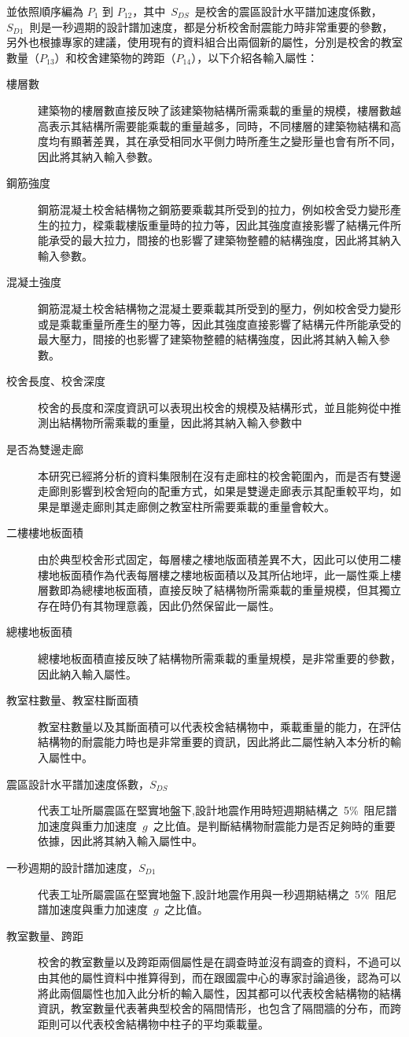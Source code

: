 並依照順序編為 $P_1$ 到 $P_{12}$，其中~$S_{DS}$~是校舍的震區設計水平譜加速度係數，~$S_{D1}$~則是一秒週期的設計譜加速度，都是分析校舍耐震能力時非常重要的參數，另外也根據專家的建議，使用現有的資料組合出兩個新的屬性，分別是校舍的教室數量（$P_{13}$）和校舍建築物的跨距（$P_{14}$），以下介紹各輸入屬性：

\begin{description}
  \item[樓層數]
  建築物的樓層數直接反映了該建築物結構所需乘載的重量的規模，樓層數越高表示其結構所需要能乘載的重量越多，同時，不同樓層的建築物結構和高度均有顯著差異，其在承受相同水平側力時所產生之變形量也會有所不同，因此將其納入輸入參數。
  \item[鋼筋強度]
  鋼筋混凝土校舍結構物之鋼筋要乘載其所受到的拉力，例如校舍受力變形產生的拉力，樑乘載樓版重量時的拉力等，因此其強度直接影響了結構元件所能承受的最大拉力，間接的也影響了建築物整體的結構強度，因此將其納入輸入參數。
  \item[混凝土強度]
  鋼筋混凝土校舍結構物之混凝土要乘載其所受到的壓力，例如校舍受力變形或是乘載重量所產生的壓力等，因此其強度直接影響了結構元件所能承受的最大壓力，間接的也影響了建築物整體的結構強度，因此將其納入輸入參數。
  \item[校舍長度、校舍深度]
  校舍的長度和深度資訊可以表現出校舍的規模及結構形式，並且能夠從中推測出結構物所需乘載的重量，因此將其納入輸入參數中
  \item[是否為雙邊走廊]
  本研究已經將分析的資料集限制在沒有走廊柱的校舍範圍內，而是否有雙邊走廊則影響到校舍短向的配重方式，如果是雙邊走廊表示其配重較平均，如果是單邊走廊則其走廊側之教室柱所需要乘載的重量會較大。
  \item[二樓樓地板面積]
  由於典型校舍形式固定，每層樓之樓地版面積差異不大，因此可以使用二樓樓地板面積作為代表每層樓之樓地板面積以及其所佔地坪，此一屬性乘上樓層數即為總樓地板面積，直接反映了結構物所需乘載的重量規模，但其獨立存在時仍有其物理意義，因此仍然保留此一屬性。
  \item[總樓地板面積]
  總樓地板面積直接反映了結構物所需乘載的重量規模，是非常重要的參數，因此納入輸入屬性。
  \item[教室柱數量、教室柱斷面積]
  教室柱數量以及其斷面積可以代表校舍結構物中，乘載重量的能力，在評估結構物的耐震能力時也是非常重要的資訊，因此將此二屬性納入本分析的輸入屬性中。
  \item[震區設計水平譜加速度係數，$S_{DS}$]
  代表工址所屬震區在堅實地盤下,設計地震作用時短週期結構之~5\%~阻尼譜加速度與重力加速度~$g$~之比值。是判斷結構物耐震能力是否足夠時的重要依據，因此將其納入輸入屬性中。
  \item[一秒週期的設計譜加速度，$S_{D1}$]
  代表工址所屬震區在堅實地盤下,設計地震作用與一秒週期結構之~5\%~阻尼譜加速度與重力加速度~$g$~之比值。
  \item[教室數量、跨距]
  校舍的教室數量以及跨距兩個屬性是在調查時並沒有調查的資料，不過可以由其他的屬性資料中推算得到，而在跟國震中心的專家討論過後，認為可以將此兩個屬性也加入此分析的輸入屬性，因其都可以代表校舍結構物的結構資訊，教室數量代表著典型校舍的隔間情形，也包含了隔間牆的分布，而跨距則可以代表校舍結構物中柱子的平均乘載量。
\end{description}

